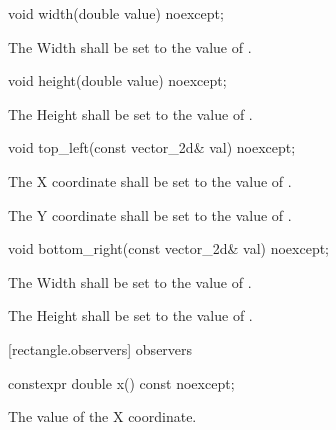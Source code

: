 \begin{itemdecl}
void width(double value) noexcept;
\end{itemdecl}
\begin{itemdescr}
\pnum
\effects
The Width shall be set to the value of .
\end{itemdescr}

\begin{itemdecl}
void height(double value) noexcept;
\end{itemdecl}
\begin{itemdescr}
\pnum
\effects
The Height shall be set to the value of .
\end{itemdescr}

\begin{itemdecl}
void top_left(const vector_2d& val) noexcept;
\end{itemdecl}
\begin{itemdescr}
\pnum
\effects
The X coordinate shall be set to the value of .

\effects
The Y coordinate shall be set to the value of .
\end{itemdescr}

\begin{itemdecl}
void bottom_right(const vector_2d& val) noexcept;
\end{itemdecl}
\begin{itemdescr}
\pnum
\effects
The Width shall be set to the value of .

\pnum
The Height shall be set to the value of .
\end{itemdescr}

 [rectangle.observers]{ observers}

\begin{itemdecl}
constexpr double x() const noexcept;
\end{itemdecl}
\begin{itemdescr}
\pnum
\returns
The value of the X coordinate.
\end{itemdescr}


